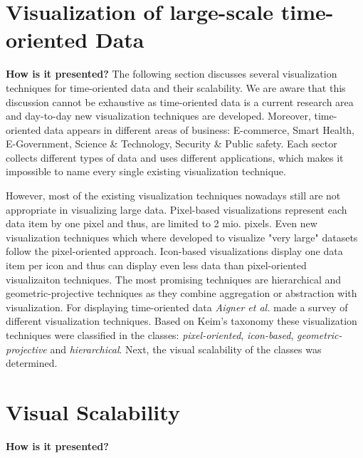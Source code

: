 \section{Visualization of large-scale time-oriented Data} \label{vis}
\textbf{How is it presented?}
The following section discusses several visualization techniques for time-oriented data and their scalability. We are aware that this discussion cannot be exhaustive as time-oriented data is a current research area and day-to-day new visualization techniques are developed.
Moreover, time-oriented data appears in different areas of business: E-commerce, Smart Health, E-Government, Science \& Technology, Security \& Public safety. Each sector collects different types of data and uses different applications, which makes it impossible to name every single existing visualization technique.

However, most of the existing visualization techniques nowadays still are not appropriate in visualizing large data. Pixel-based visualizations represent each data item by one pixel and thus, are limited to 2 mio. pixels. Even new visualization techniques which where developed to visualize "very large" datasets follow the pixel-oriented approach\cite{Keim1995, Keim1996}. Icon-based visualizations display one data item per icon and thus can display even less data than pixel-oriented visualizaiton techniques. The most promising techniques are hierarchical and geometric-projective techniques as they combine aggregation or abstraction with visualization. 
For displaying time-oriented data \textit{Aigner et al.} made a survey of different visualization techniques. Based on Keim's taxonomy\cite{Keim1995} these visualization techniques were classified in the classes: \textit{pixel-oriented}, \textit{icon-based}, \textit{geometric-projective} and \textit{hierarchical}. Next, the visual scalability of the classes was determined. 

\section{Visual Scalability}

\iffalse
\textbf{How is it presented?}


